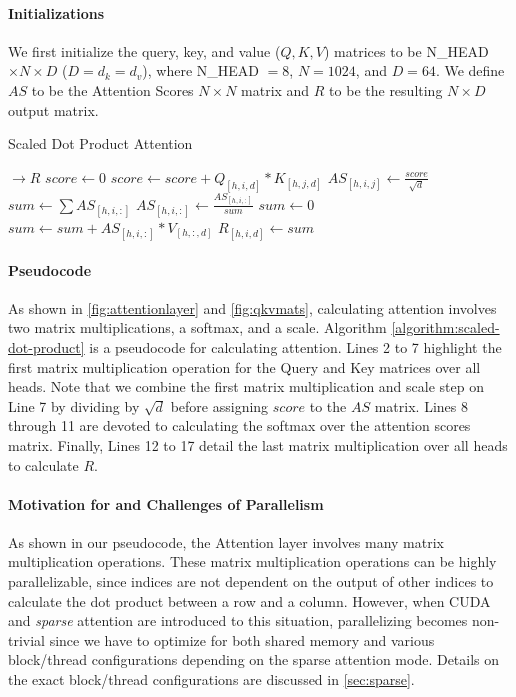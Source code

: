 \documentclass[11pt]{article}
\begin{document}
\paragraph{Initializations} We first initialize the query, key, and value ($Q,K,V$) matrices to be N\_HEAD$\times N\times D$ ($D = d_k = d_v$), where N\_HEAD $=8$, $N=1024$, and $D = 64$. We define $AS$ to be the Attention Scores $N\times N$ matrix and $R$ to be the resulting $N\times D$ output matrix.

\begin{algorithm}
\caption{Scaled Dot Product Attention}
\begin{algorithmic}[1]
 $\rightarrow R$
\EndProcedure
\State {}
    \State $score \gets 0$
        \State $score \gets score + Q_{[h,i,d]} * K_{[h,j,d]}$
    \EndFor
    \State $AS_{[h,i,j]} \gets \frac{score}{\sqrt{d}}$
\EndFor
\State {}
    \State $sum \gets \sum AS_{[h,i,:]}$
    \State $AS_{[h,i,:]} \gets \frac{AS_{[h,i,:]}}{sum}$
\EndFor
\State {}
    \State $sum \gets 0$
        \State $sum \gets sum + AS_{[h,i,:]} * V_{[h,:,d]}$
    \EndFor
    \State $R_{[h,i,d]} \gets sum$
\EndFor
\end{algorithmic}
\label{algorithm:scaled-dot-product}
\end{algorithm}

\paragraph{Pseudocode} As shown in \autoref{fig:attentionlayer} and \autoref{fig:qkvmats}, calculating attention involves two matrix multiplications, a softmax, and a scale. Algorithm \autoref{algorithm:scaled-dot-product} is a pseudocode for calculating attention. Lines 2 to 7 highlight the first matrix multiplication operation for the Query and Key matrices over all heads. Note that we combine the first matrix multiplication and scale step on Line 7 by dividing by $\sqrt{d}$ before assigning $score$ to the $AS$ matrix. Lines 8 through 11 are devoted to calculating the softmax over the attention scores matrix. Finally, Lines 12 to 17 detail the last matrix multiplication over all heads to calculate $R$.

\paragraph{Motivation for and Challenges of Parallelism}
As shown in our pseudocode, the Attention layer involves many matrix multiplication operations. These matrix multiplication operations can be highly parallelizable, since indices are not dependent on the output of other indices to calculate the dot product between a row and a column. However, when CUDA and \textit{sparse} attention are introduced to this situation, parallelizing becomes non-trivial since we have to optimize for both shared memory and various block/thread configurations depending on the sparse attention mode. Details on the exact block/thread configurations are discussed in \autoref{sec:sparse}.
\end{document}
